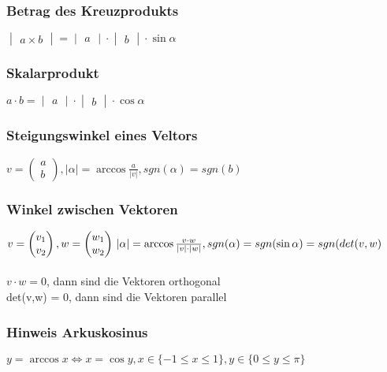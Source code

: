\documentclass[6pt,a4paper]{scrartcl}
\newcommand{\abs}[1]{\ensuremath{\left\vert#1\right\vert}}
\begin{document}
\begin{multicols*}{3}
\subsubsection{Betrag des Kreuzprodukts}
$\begin{vmatrix}a \times b\end{vmatrix} = \begin{vmatrix}a\end{vmatrix} \cdot \begin{vmatrix}b\end{vmatrix} \cdot \sin \alpha$\\
\subsubsection{Skalarprodukt}
$a \cdot b = \begin{vmatrix}a\end{vmatrix} \cdot \begin{vmatrix}b\end{vmatrix} \cdot \cos \alpha$\\
\subsubsection{Steigungswinkel eines Veltors}
$v = \begin{pmatrix}a\\b\end{pmatrix}, \abs{\alpha}=\arccos{\frac{a}{\abs{v}}}, sgn(\alpha)=sgn(b)$
\\
\subsubsection{Winkel zwischen Vektoren}
$v = \begin{pmatrix}v_1\\v_2\end{pmatrix}, w = \begin{pmatrix}w_1\\w_2\end{pmatrix}
\\
\abs{\alpha} = \arccos{\frac{v \cdot w}{\abs{v} \cdot \abs{w}}}, sgn(\alpha) = sgn(\sin{\alpha}) = sgn(det(v,w)$\\
\\
$v \cdot w = 0$, dann sind die Vektoren orthogonal\\
det(v,w) = 0, dann sind die Vektoren parallel
\\
\subsubsection{Hinweis Arkuskosinus}
$y = \arccos{x} \Leftrightarrow x = \cos{y}, x \in \{-1 \leq x \leq 1 \}, y \in \{0 \leq y \leq \pi\}$

\end{multicols*}
\end{document}
